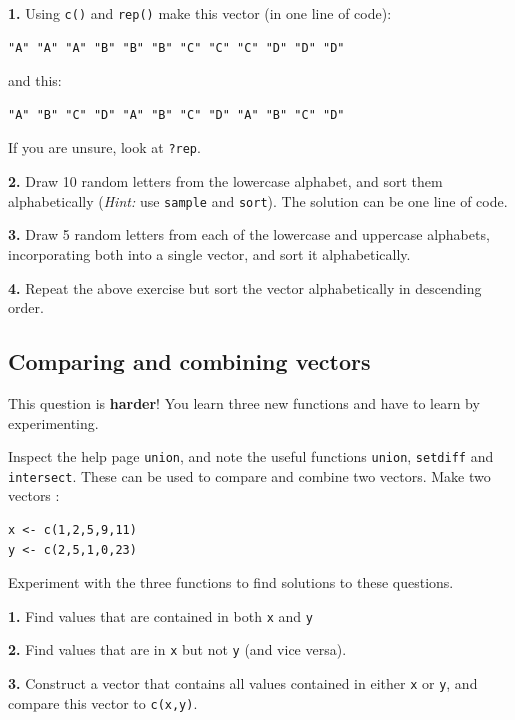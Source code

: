 \documentclass[]{book}
\begin{document}
\textbf{1.} Using \texttt{c()} and \texttt{rep()} make this vector (in one line of code):

\begin{verbatim}
"A" "A" "A" "B" "B" "B" "C" "C" "C" "D" "D" "D"
\end{verbatim}

and this:

\begin{verbatim}
"A" "B" "C" "D" "A" "B" "C" "D" "A" "B" "C" "D"
\end{verbatim}

If you are unsure, look at \texttt{?rep}.

\textbf{2.} Draw 10 random letters from the lowercase alphabet, and sort them alphabetically (\emph{Hint:} use \texttt{sample} and \texttt{sort}). The solution can be one line of code.

\textbf{3.} Draw 5 random letters from each of the lowercase and uppercase alphabets, incorporating both into a single vector, and sort it alphabetically.

\textbf{4.} Repeat the above exercise but sort the vector alphabetically in descending order.

\hypertarget{comparing-and-combining-vectors}{%
\subsection{Comparing and combining vectors}\label{comparing-and-combining-vectors}}

This question is \textbf{harder}! You learn three new functions and have to learn by experimenting.

Inspect the help page \texttt{union}, and note the useful functions \texttt{union}, \texttt{setdiff} and \texttt{intersect}. These can be used to compare and combine two vectors. Make two vectors :

\begin{verbatim}
x <- c(1,2,5,9,11)
y <- c(2,5,1,0,23)
\end{verbatim}

Experiment with the three functions to find solutions to these questions.

\textbf{1.} Find values that are contained in both \texttt{x} and \texttt{y}

\textbf{2.} Find values that are in \texttt{x} but not \texttt{y} (and vice versa).

\textbf{3.} Construct a vector that contains all values contained in either \texttt{x} or \texttt{y}, and compare this vector to \texttt{c(x,y)}.
\end{document}
